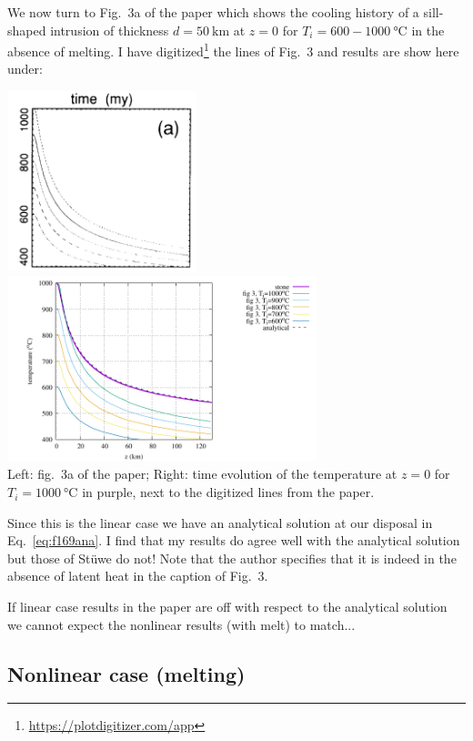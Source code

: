 We now turn to Fig.~3a of the paper which shows the 
cooling history of a sill-shaped intrusion of thickness $d=50~\si{\km}$ at $z=0$
for $T_i=600-1000~\si{\celsius}$ in the absence of melting. 
I have digitized\footnote{\url{https://plotdigitizer.com/app}} the lines of Fig.~3 
and results are show here under:
\begin{center}
\includegraphics[width=5.5cm]{python_codes/fieldstone_169/images/fig3a}
\includegraphics[width=9cm]{python_codes/fieldstone_169/results/linear/midT.pdf}\\
{\captionfont Left: fig.~3a of the paper; Right: time evolution of the 
temperature at $z=0$ for $T_i=1000~\si{\celsius}$ in purple, next to the 
digitized lines from the paper.}
\end{center}
Since this is the linear case we have an analytical solution at our disposal
in Eq.~\eqref{eq:f169ana}.
I find that my results do agree well with the analytical solution 
but those of St{\"u}we do not! Note that the author specifies that it is
indeed in the absence of latent heat in the caption of Fig.~3. 

{\color{red} If linear case results in the paper are off 
with respect to the analytical solution we cannot 
expect the nonlinear results (with melt) to match...}



\subsection*{Nonlinear case (melting)}

